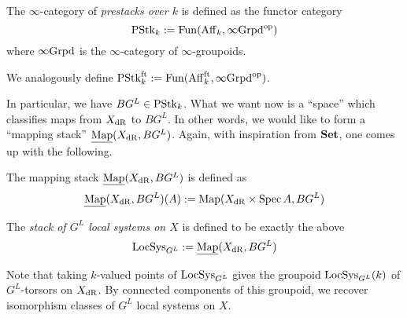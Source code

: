 \documentclass[./main.tex]{subfiles}
\begin{document}
\begin{dfn}
  
  The $\infty$-category of \emph{prestacks over $k$} is defined as
  the functor category
  \[
    \operatorname{PStk}_k := \mathrm{Fun}(\mathrm{Aff}_k , \infty\mathrm{Grpd}^{\mathrm{op}})
  \]
  where $\infty\mathrm{Grpd}$ is the $\infty$-category of $\infty$-groupoids.

  We analogously define 
  $\operatorname{PStk}_k^{\mathrm{ft}} := \mathrm{Fun}(\mathrm{Aff}_k^{\mathrm{ft}} , \infty\mathrm{Grpd}^{\mathrm{op}})$.
\end{dfn}
In particular, we have $BG^L \in \operatorname{PStk}_k$.
What we want now is a ``space'' which classifies
maps from $X_{\mathrm{dR}}$ to $BG^L$.
In other words, we would like to form a ``mapping stack''
$\underline{\operatorname{Map}}(X_{\mathrm{dR}} , BG^L)$.
Again, with inspiration from $\mathbf{Set}$,
one comes up with the following.
\begin{dfn}
  The mapping stack $\underline{\operatorname{Map}}(X_{\mathrm{dR}} , BG^L)$ is defined as \[
    \underline{\operatorname{Map}}(X_{\mathrm{dR}} , BG^L)(A) := 
    \operatorname{Map}(X_{\mathrm{dR}} \times \operatorname{Spec} A , BG^L)
  \]

  The \emph{stack of $G^L$ local systems on $X$} is defined to be
  exactly the above \[
    \operatorname{LocSys}_{G^L} := \underline{\operatorname{Map}}(X_{\mathrm{dR}} , BG^L)
  \]
\end{dfn}
Note that taking $k$-valued points of $\operatorname{LocSys}_{G^L}$ gives
the groupoid $\operatorname{LocSys}_{G^L}(k)$ of $G^L$-torsors on $X_{\mathrm{dR}}$.
By connected components of this groupoid, we recover
isomorphism classes of $G^L$ local systems on $X$.
\end{document}
